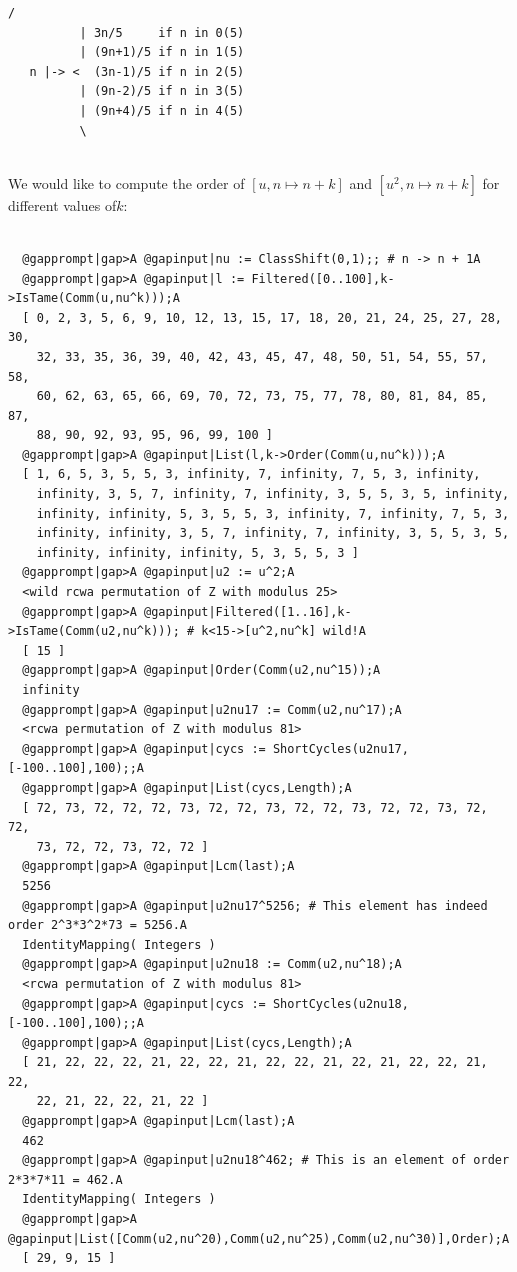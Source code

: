 \documentclass[a4paper,11pt]{report}
\begin{document}
{{\begin{Verbatim}[commandchars=!@A,fontsize=\small,frame=single,label=Example]
          /
          | 3n/5     if n in 0(5)
          | (9n+1)/5 if n in 1(5)
   n |-> <  (3n-1)/5 if n in 2(5)
          | (9n-2)/5 if n in 3(5)
          | (9n+4)/5 if n in 4(5)
          \
  
\end{Verbatim}
 We would like to compute the order of $[u,n \mapsto n + k]$ and $[u^2,n \mapsto n + k]$ for different values of{\nobreakspace}$k$: 
\begin{Verbatim}[commandchars=@|A,fontsize=\small,frame=single,label=Example]
  
  @gapprompt|gap>A @gapinput|nu := ClassShift(0,1);; # n -> n + 1A
  @gapprompt|gap>A @gapinput|l := Filtered([0..100],k->IsTame(Comm(u,nu^k)));A
  [ 0, 2, 3, 5, 6, 9, 10, 12, 13, 15, 17, 18, 20, 21, 24, 25, 27, 28, 30, 
    32, 33, 35, 36, 39, 40, 42, 43, 45, 47, 48, 50, 51, 54, 55, 57, 58, 
    60, 62, 63, 65, 66, 69, 70, 72, 73, 75, 77, 78, 80, 81, 84, 85, 87, 
    88, 90, 92, 93, 95, 96, 99, 100 ]
  @gapprompt|gap>A @gapinput|List(l,k->Order(Comm(u,nu^k)));A
  [ 1, 6, 5, 3, 5, 5, 3, infinity, 7, infinity, 7, 5, 3, infinity, 
    infinity, 3, 5, 7, infinity, 7, infinity, 3, 5, 5, 3, 5, infinity, 
    infinity, infinity, 5, 3, 5, 5, 3, infinity, 7, infinity, 7, 5, 3, 
    infinity, infinity, 3, 5, 7, infinity, 7, infinity, 3, 5, 5, 3, 5, 
    infinity, infinity, infinity, 5, 3, 5, 5, 3 ]
  @gapprompt|gap>A @gapinput|u2 := u^2;A
  <wild rcwa permutation of Z with modulus 25>
  @gapprompt|gap>A @gapinput|Filtered([1..16],k->IsTame(Comm(u2,nu^k))); # k<15->[u^2,nu^k] wild!A
  [ 15 ]
  @gapprompt|gap>A @gapinput|Order(Comm(u2,nu^15));A
  infinity
  @gapprompt|gap>A @gapinput|u2nu17 := Comm(u2,nu^17);A
  <rcwa permutation of Z with modulus 81>
  @gapprompt|gap>A @gapinput|cycs := ShortCycles(u2nu17,[-100..100],100);;A
  @gapprompt|gap>A @gapinput|List(cycs,Length);A
  [ 72, 73, 72, 72, 72, 73, 72, 72, 73, 72, 72, 73, 72, 72, 73, 72, 72, 
    73, 72, 72, 73, 72, 72 ]
  @gapprompt|gap>A @gapinput|Lcm(last);A
  5256
  @gapprompt|gap>A @gapinput|u2nu17^5256; # This element has indeed order 2^3*3^2*73 = 5256.A
  IdentityMapping( Integers )
  @gapprompt|gap>A @gapinput|u2nu18 := Comm(u2,nu^18);A
  <rcwa permutation of Z with modulus 81>
  @gapprompt|gap>A @gapinput|cycs := ShortCycles(u2nu18,[-100..100],100);;A
  @gapprompt|gap>A @gapinput|List(cycs,Length);A
  [ 21, 22, 22, 22, 21, 22, 22, 21, 22, 22, 21, 22, 21, 22, 22, 21, 22, 
    22, 21, 22, 22, 21, 22 ]
  @gapprompt|gap>A @gapinput|Lcm(last);A
  462
  @gapprompt|gap>A @gapinput|u2nu18^462; # This is an element of order 2*3*7*11 = 462.A
  IdentityMapping( Integers )
  @gapprompt|gap>A @gapinput|List([Comm(u2,nu^20),Comm(u2,nu^25),Comm(u2,nu^30)],Order);A
  [ 29, 9, 15 ]
  

\end{Verbatim}}}
\end{document}
